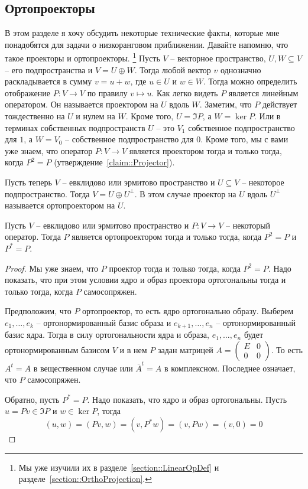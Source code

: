 \subsection{Ортопроекторы}

В этом разделе я хочу обсудить некоторые технические факты, которые мне понадобятся для задачи о низкоранговом приближении.
Давайте напомню, что такое проекторы и ортопроекторы.%
\footnote{Мы уже изучили их в разделе~\ref{section::LinearOpDef} и разделе~\ref{section::OrthoProjection}.}
Пусть $V$ -- векторное пространство, $U, W\subseteq V$ -- его подпространства и $V = U \oplus W$.
Тогда любой вектор $ v$ однозначно раскладывается в сумму $v = u + w$, где $u\in U$ и $w\in W$.
Тогда можно определить отображение $P\colon V\to V$ по правилу $v\mapsto u$.
Как легко видеть $P$ является линейным оператором.
Он называется проектором на $U$ вдоль $W$.
Заметим, что $P$ действует тождественно на $U$ и нулем на $W$.
Кроме того, $U = \Im P$, а $W = \ker P$.
Или в терминах собственных подпространств $U$ -- это $V_1$ собственное подпространство для $1$, а $W = V_0$ -- собственное подпространство для $0$.
Кроме того, мы с вами уже знаем, что оператор $P\colon V\to V$ является проектором тогда и только тогда, когда $P^2 = P$ (утверждение~\ref{claim::Projector}).

Пусть теперь $V$ -- евклидово или эрмитово пространство и $U\subseteq V$ -- некоторое подпространство.
Тогда $V = U\oplus U^\bot$.
В этом случае проектор на $U$ вдоль $U^\bot$ называется ортопроектором на $U$.

\begin{claim}
Пусть $V$ -- евклидово или эрмитово пространство и $P\colon V\to V$ -- некоторый оператор.
Тогда $P$ является ортопроектором тогда и только тогда, когда $P^2 = P$ и $P^* = P$.
\end{claim}
\begin{proof}
Мы уже знаем, что $P$ проектор тогда и только тогда, когда $P^2 = P$.
Надо показать, что при этом условии ядро и образ проектора ортогональны тогда и только тогда, когда $P$ самосопряжен.

Предположим, что $P$ ортопроектор, то есть ядро ортогонально образу.
Выберем $e_1,\ldots,e_k$ -- ортонормированный базис образа и $e_{k+1}, \ldots,e_n$ -- ортонормированный базис ядра.
Тогда в силу ортогональности ядра и образа, $e_1,\ldots,e_n$ будет ортонормированным базисом $V$ и в нем $P$ задан матрицей $A=\left(\begin{smallmatrix}{E}&{0}\\{0}&{0}\end{smallmatrix}\right)$.
То есть $A^t = A$ в вещественном случае или $\bar A^t  = A$ в комплексном.
Последнее означает, что $P$ самосопряжен.

Обратно, пусть $P^* = P$.
Надо показать, что ядро и образ ортогональны.
Пусть $u = Pv\in \Im P$ и $w \in \ker P$, тогда
\[
(u, w) = (Pv, w) = (v, P^*w) = (v, Pw) = (v, 0) = 0
\]
\end{proof}

